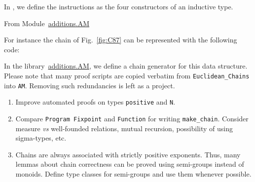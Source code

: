 In \coq{}, we define the instructions as the four constructors of an inductive type.

From Module~\href{../theories/html/additions.AM.html}{additions.AM}


For instance the chain of Fig.~\vref{fig:C87} can be represented with the following code:



In the library~\href{../theories/html/additions.AM.html}{additions.AM},
we define a chain generator for this data structure. 
Please note that many proof scripts are copied verbatim from 
\texttt{Euclidean\_Chains} into \texttt{AM}. Removing such redundancies is left as a project.



\begin{project}
 \begin{enumerate}
\item Improve automated proofs on types \texttt{positive} and \texttt{N}.
\item Compare  \texttt{Program Fixpoint} and \texttt{Function} for
writing \texttt{make\_chain}. Consider measure \emph{vs} well-founded 
relations, mutual recursion, possibility of using sigma-types, etc.
\item Chains are always associated with strictly positive exponents. 
Thus, many lemmas about chain correctness  can be proved using semi-groups instead of
monoids. Define type classes for semi-groups and use them whenever possible.
\end{enumerate}  
\end{project}











